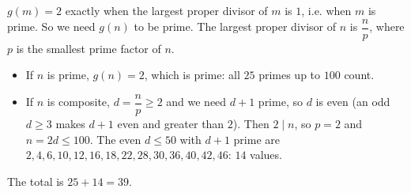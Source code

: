 $g(m)=2$ exactly when the largest proper divisor of $m$ is $1$, i.e. when $m$ is prime. So we need $g(n)$ to be prime. The largest proper divisor of $n$ is $\dfrac np$, where $p$ is the smallest prime factor of $n$.
\begin{itemize}
\item If $n$ is prime, $g(n)=2$, which is prime: all $25$ primes up to $100$ count.
\item If $n$ is composite, $d=\dfrac np\ge2$ and we need $d+1$ prime, so $d$ is even (an odd $d\ge3$ makes $d+1$ even and greater than $2$). Then $2\mid n$, so $p=2$ and $n=2d\le100$. The even $d\le50$ with $d+1$ prime are $2,4,6,10,12,16,18,22,28,30,36,40,42,46$: $14$ values.
\end{itemize}
The total is $25+14=\boxed{39}$.
